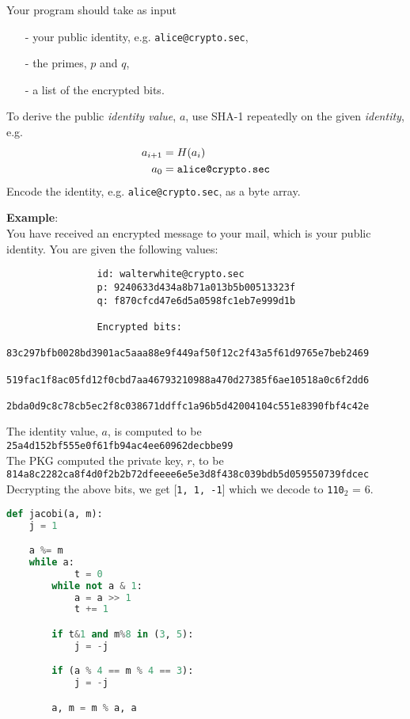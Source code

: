 \documentclass{article}
\begin{document}
\begin{description}
{				Your program should take as input
				\begin{itemize}
					\item[-] your public identity, e.g. \texttt{alice@crypto.sec},
					\item[-] the primes, $p$ and $q$,
					\item[-] a list of the encrypted bits.
				\end{itemize}
				To derive the public \emph{identity value}, $a$, use SHA-1 repeatedly on the given \emph{identity}, e.g.
				\begin{align*}
				a_{i+1} &= H(a_i) \\
				a_0 &= \text{\texttt{alice@crypto.sec}}
				\end{align*}
				Encode the identity, e.g. \texttt{alice@crypto.sec}, as a byte array.
				
				\textbf{Example}:\\
				You have received an encrypted message to your mail, which is your public identity.
				You are given the following values:
				\begin{verbatim}
				id: walterwhite@crypto.sec
				p: 9240633d434a8b71a013b5b00513323f
				q: f870cfcd47e6d5a0598fc1eb7e999d1b
				
				Encrypted bits:
				83c297bfb0028bd3901ac5aaa88e9f449af50f12c2f43a5f61d9765e7beb2469
				519fac1f8ac05fd12f0cbd7aa46793210988a470d27385f6ae10518a0c6f2dd6
				2bda0d9c8c78cb5ec2f8c038671ddffc1a96b5d42004104c551e8390fbf4c42e
				\end{verbatim}
				The identity value, $a$, is computed to be\\
				\texttt{25a4d152bf555e0f61fb94ac4ee60962decbbe99}\\
				The PKG computed the private key, $r$, to be\\
				\texttt{814a8c2282ca8f4d0f2b2b72dfeeee6e5e3d8f438c039bdb5d059550739fdcec}\\
				Decrypting the above bits, we get [\texttt{1, 1, -1}] which we decode to \texttt{110}$_2$ = $6$.
\begin{lstlisting}[float=htb, style=customc, language=python, caption={The Jacobi symbol in Python.}, label={lst:jacobi}]
def jacobi(a, m):
	j = 1

	a %= m
	while a:
			t = 0
		while not a & 1:
			a = a >> 1
			t += 1

		if t&1 and m%8 in (3, 5):
			j = -j

		if (a % 4 == m % 4 == 3):
			j = -j

		a, m = m % a, a


\end{lstlisting}}
\end{description}
\end{document}
